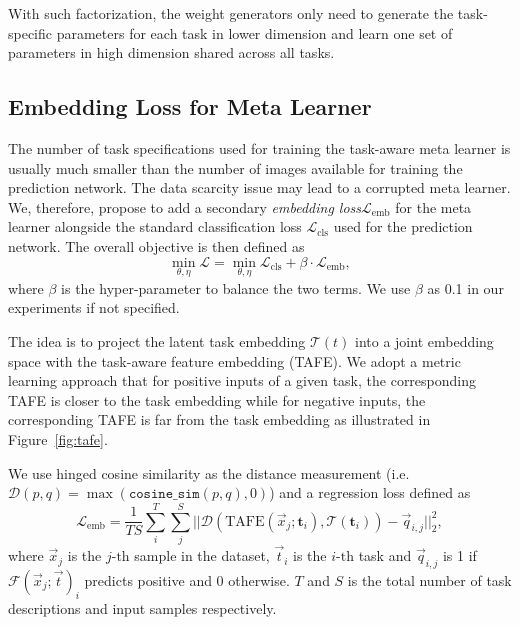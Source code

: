 \documentclass[10pt,twocolumn,letterpaper]{article}
\newcommand{\joey}[1]{\textcolor{blue}{[Joey: #1]}}
\renewcommand{\vec}[1]{\mathbf{#1}}
\begin{document}
With such factorization, the weight generators only need to generate the 
task-specific parameters for each task in lower dimension and learn one set of
parameters in high dimension shared across all tasks. 

\subsection{Embedding Loss for Meta Learner}
The number of task specifications used for training the
task-aware meta learner is usually much smaller than the number of images available
for training the prediction network. The data scarcity issue may lead to a 
corrupted meta learner. We, therefore, propose to add a secondary \textit{embedding
loss}$\mathcal{L}_\text{emb}$ for the meta learner alongside the standard classification loss $\mathcal{L}_\text{cls}$ used for the 
prediction network. The overall objective is then defined as 
\begin{equation}
    \min_{\theta, \eta} \mathcal{L} = \min_{\theta, \eta} \mathcal{L}_\text{cls}
    + \beta \cdot \mathcal{L}_\text{emb},
\end{equation}
where $\beta$ is the hyper-parameter to balance the two terms. We use $\beta$
as 0.1 in our experiments if not specified. 

The idea is to project the latent task embedding $\mathcal{T}(t)$ into a
joint embedding space with the task-aware feature embedding (TAFE). We adopt a metric learning approach that for positive inputs of a
given task, 
the corresponding TAFE is 
closer to the task embedding while for negative inputs, the corresponding TAFE is
far from the task embedding as illustrated in Figure~\ref{fig:tafe}.

We use hinged cosine similarity as the distance measurement  
(i.e. $\mathcal{D}(p, q) = \max(\texttt{cosine\_sim}(p, q), 0)$)  and a regression
loss defined as 
\begin{equation}
    \mathcal{L}_\text{emb} =\frac{1}{TS} \sum_i^T\sum_j^S{||\mathcal{D}(\text{TAFE}(\Vec{x}_j; \vec{t}_i), \mathcal{T}(\vec{t}_i)) - \Vec{q}_{i,j}||_2^2},
\end{equation}
where $\Vec{x}_j$ is the $j\text{-th}$ sample in the dataset, $\Vec{t}_i$ is 
the $i\text{-th}$ task and $\Vec{q}_{i,j}$ is 1 if $\mathcal{F}(\Vec{x}_j; \Vec{t})_i$ predicts positive and 0 otherwise.
$T$ and $S$ is the total number of task descriptions and input samples respectively.
\end{document}
